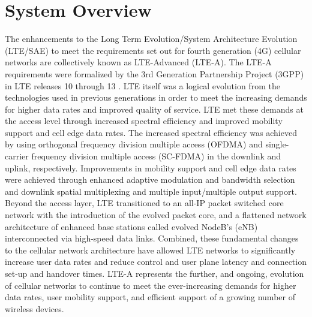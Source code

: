 \section{System Overview}
\label{sys-overview}
The enhancements to the Long Term Evolution/System Architecture Evolution (LTE/SAE) to meet the requirements set out for fourth generation (4G) cellular networks are collectively known as LTE-Advanced (\mbox{LTE-A}).  The \mbox{LTE-A} requirements were formalized by the 3rd Generation Partnership Project (3GPP) in LTE releases 10 through 13 \cite{tr36913}.  LTE itself was a logical evolution from the technologies used in previous generations in order to meet the increasing demands for higher data rates and improved quality of service. LTE met these demands at the access level through increased spectral efficiency and improved mobility support and cell edge data rates.  The increased spectral efficiency was achieved by using orthogonal frequency division multiple access (OFDMA) and single-carrier frequency division multiple access (SC-FDMA) in the downlink and uplink, respectively.  Improvements in mobility support and cell edge data rates were achieved through enhanced adaptive modulation and bandwidth selection and downlink spatial multiplexing and multiple input/multiple output support.  Beyond the access layer, LTE transitioned to an all-IP packet switched core network with the introduction of the evolved packet core, and a flattened network architecture of enhanced base stations called evolved NodeB's (eNB) interconnected via high-speed data links.  Combined, these fundamental changes to the cellular network architecture have allowed LTE networks to significantly increase user data rates and reduce control and user plane latency and connection set-up and handover times.  \mbox{LTE-A} represents the further, and ongoing, evolution of cellular networks to continue to meet the ever-increasing demands for higher data rates, user mobility support, and efficient support of a growing number of wireless devices.

